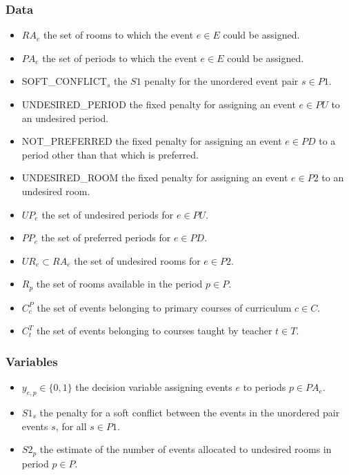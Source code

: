 \documentclass{article}
\theoremstyle{plain}
\numberwithin{theorem}{section}
\numberwithin{example}{section}
\theoremstyle{definition}
\begin{document}
\subsubsection*{Data}
\begin{itemize}
    \item $RA_e$ the set of rooms to which the event $e \in E$ could be
        assigned.
    \item $PA_e$ the set of periods to which the event $e \in E$ could be
        assigned.
    \item SOFT\_CONFLICT$_s$ the $S1$ penalty for the unordered event pair $s \in
        P1$.
    \item UNDESIRED\_PERIOD the fixed penalty for assigning an event $e \in PU$
        to an undesired period.
    \item NOT\_PREFERRED the fixed penalty for assigning an event $e \in PD$ to
        a period other than that which is preferred.
    \item UNDESIRED\_ROOM the fixed penalty for assigning an event $e \in P2$ to
        an undesired room.
    \item $UP_e$ the set of undesired periods for $e \in PU$.
    \item $PP_e$ the set of preferred periods for $e \in PD$.
    \item $UR_e \subset RA_e$ the set of undesired rooms for $e \in P2$.
    \item $R_p$ the set of rooms available in the period $p \in P$.
    \item $C^P_c$ the set of events belonging to primary courses of curriculum
        $c \in C$.
    \item $C^T_t$ the set of events belonging to courses taught by teacher $t
        \in T$.
\end{itemize}

\subsubsection*{Variables}
\begin{itemize}
    \item $y_{e, p} \in \{0,1\}$ the decision variable assigning events $e$ to
        periods $p \in PA_e$.
    \item $S1_s$ the penalty for a soft conflict between the events in the
        unordered pair events $s$, for all $s \in P1$.
    \item $S2_p$ the estimate of the number of events allocated to undesired
        rooms in period $p \in P$.
\end{itemize}
\end{document}
